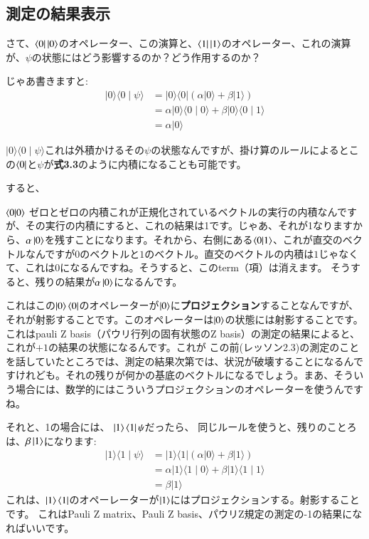 \subsection{測定の結果表示}
さて、$\bra{0}\ket{0}$のオペレーター、この演算と、$\bra{1}\ket{1}$のオペレーター、これの演算が、$\psi$の状態にはどう影響するのか？どう作用するのか？

じゃあ書きますと:
\begin{equation}
\begin{aligned}
|0\rangle\langle 0 \mid \psi\rangle &=|0\rangle\langle 0|(\alpha|0\rangle+\beta|1\rangle)\\
&=\alpha|0\rangle\langle 0 \mid 0\rangle+\beta|0\rangle\langle 0 \mid 1\rangle \\
&=\alpha|0\rangle
\end{aligned}
\end{equation}

$|0\rangle\langle 0 \mid \psi\rangle$これは外積かけるその$\psi$の状態なんですが、掛け算のルールによるとこの$\bra{0}$と$\psi$が\textbf{式3.3}のように内積になることも可能です。

すると、

$\braket{0|0}$
ゼロとゼロの内積これが正規化されているベクトルの実行の内積なんですが、その実行の内積にすると、これの結果は1です。じゃあ、それが1なりますから、$\alpha\ket{0}$を残すことになります。それから、右側にある$\braket{0|1}$、これが直交のベクトルなんですが$0$のベクトルと$1$のベクトル。直交のベクトルの内積は$1$じゃなくて、これは$0$になるんですね。そうすると、このterm（項）は消えます。
そうすると、残りの結果が$\alpha\ket{0}$になるんです。


これはこの$\ket{0}\bra{0}$のオペレーターが$\ket{0}$に\textbf{プロジェクション}することなんですが、それが射影することです。このオペレーターは$\ket{0}$の状態には射影することです。これはpauli Z basis（パウリ行列の固有状態のZ basis）の測定の結果によると、これが$+1$の結果の状態になるんです。これが
この前(レッソン2.3)の測定のことを話していたところでは、測定の結果次第では、状況が破壊することになるんですけれども。それの残りが何かの基底のベクトルになるでしょう。まあ、そういう場合には、数学的にはこういうプロジェクションのオペレーターを使うんですね。

それと、1の場合には、 $\ket{1}\bra{1}\psi$だったら、
同じルールを使うと、残りのことろは、$\beta\ket{1}$になります:
\begin{equation}
\begin{aligned}
|1\rangle\langle 1 \mid \psi\rangle &=|1\rangle\langle 1|(\alpha|0\rangle+\beta|1\rangle)\\
&=\alpha|1\rangle\langle 1 \mid 0\rangle+\beta|1\rangle\langle 1 \mid 1\rangle \\
&=\beta|1\rangle
\end{aligned}
\end{equation}
これは、$\ket{1}\bra{1}$のオペーレーターが$\ket{1}$にはプロジェクションする。射影することです。
これはPauli Z matrix、Pauli Z basis、パウリZ規定の測定の-1の結果になればいいです。

